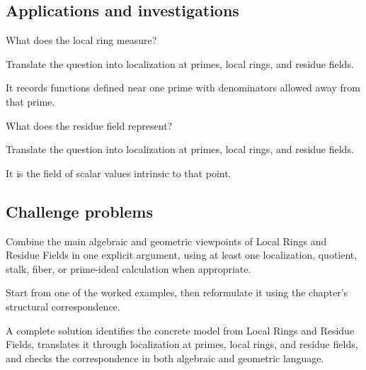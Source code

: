 \subsection*{Applications and investigations}

\begin{exercise}\label{exr:vi11-expand-13}
What does the local ring measure?
\end{exercise}
\begin{hint}
Translate the question into localization at primes, local rings, and residue fields.
\end{hint}
\begin{solution}
It records functions defined near one prime with denominators allowed away from that prime.
\end{solution}

\begin{exercise}\label{exr:vi11-expand-14}
What does the residue field represent?
\end{exercise}
\begin{hint}
Translate the question into localization at primes, local rings, and residue fields.
\end{hint}
\begin{solution}
It is the field of scalar values intrinsic to that point.
\end{solution}

\subsection*{Challenge problems}

\begin{exercise}\label{exr:vi11-expand-15}
Combine the main algebraic and geometric viewpoints of Local Rings and Residue Fields in one explicit argument, using at least one localization, quotient, stalk, fiber, or prime-ideal calculation when appropriate.
\end{exercise}
\begin{hint}
Start from one of the worked examples, then reformulate it using the chapter's structural correspondence.
\end{hint}
\begin{solution}
A complete solution identifies the concrete model from Local Rings and Residue Fields, translates it through localization at primes, local rings, and residue fields, and checks the correspondence in both algebraic and geometric language.
\end{solution}

